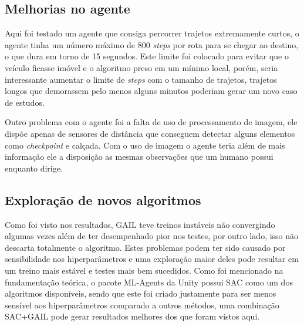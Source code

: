 \subsection*{Melhorias no agente}
Aqui foi testado um agente que consiga percorrer trajetos extremamente curtos, o agente tinha um número máximo de 800 \textit{steps} por rota para se chegar ao destino, o que dura em torno de 15 segundos. Este limite foi colocado para evitar que o veículo ficasse imóvel e o algoritmo preso em um mínimo local, porém, seria interessante aumentar o limite de \textit{steps} com o tamanho de trajetos, trajetos longos que demorassem pelo menos alguns minutos poderiam gerar um novo caso de estudos.

Outro problema com o agente foi a falta de uso de processamento de imagem, ele dispõe apenas de sensores de distância que conseguem detectar alguns elementos como \textit{checkpoint} e calçada. Com o uso de imagem o agente teria além de mais informação ele a disposição as mesmas observações que um humano possui enquanto dirige.

\subsection*{Exploração de novos algoritmos}
Como foi visto nos resultados, GAIL teve treinos instáveis não convergindo algumas vezes além de ter desempenhado pior nos testes, por outro lado, isso não descarta totalmente o algoritmo. Estes problemas podem ter sido causado por sensibilidade nos hiperparâmetros e uma exploração maior deles pode resultar em um treino mais estável e testes mais bem sucedidos. Como foi mencionado na fundamentação teórica, o pacote ML-Agents da Unity possui SAC como um dos algoritmos disponíveis, sendo que este foi criado justamente para ser menos sensível aos hiperparâmetros comparado a outros métodos, uma combinação SAC+GAIL pode gerar resultados melhores dos que foram vistos aqui.